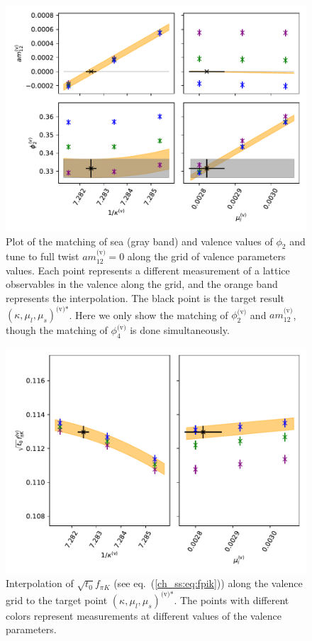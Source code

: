 \begin{figure}
    \centering
    \includegraphics[width=.9\textwidth]{./cap4/figs/matching_H105.pdf}
    \caption{Plot of the matching of sea (gray band) and valence values of $\phi_2$ and tune to full twist $am_{12}^{\textrm{(v)}}=0$ along the grid of valence parameters values. Each point represents a different measurement of a lattice observables in the valence along the grid, and the orange band represents the interpolation. The black point is the target result $\left(\kappa,\mu_l,\mu_s\right)^{\textrm{(v)*}}$. Here we only show the matching of $\phi_2^{\textrm{(v)}}$ and $am_{12}^{\textrm{(v)}}$, though the matching of $\phi_4^{\textrm{(v)}}$ is done simultaneously.}
    \label{ch_ma:fig:match}
\end{figure}

\begin{figure}
    \centering
    \includegraphics[width=.9\textwidth]{./cap4/figs/interp_fpik_H105.pdf}
    \caption{Interpolation of $\sqrt{t_0}f_{\pi K}$ (see eq.~(\ref{ch_ss:eq:fpik})) along the valence grid to the target point $\left(\kappa,\mu_l,\mu_s\right)^{\textrm{(v)*}}$. The points with different colors represent measurements at different values of the valence parameters.}
    \label{ch_ma:fig:fpik_interp}
\end{figure}

